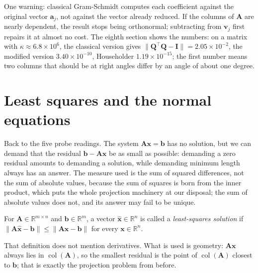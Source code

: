 One warning: classical Gram-Schmidt computes each coefficient against the original vector
$\mathbf{a}_{j}$, not against the vector already reduced. If the columns of $\mathbf{A}$ are
nearly dependent, the result stops being orthonormal; subtracting from $\mathbf{v}_{j}$ first
repairs it at almost no cost. The eighth section shows the numbers: on a
matrix with $\kappa\approx6.8\times10^{6}$, the classical version gives
$\|\mathbf{Q}^{\top}\mathbf{Q}-\mathbf{I}\|=2.05\times10^{-2}$, the modified version
$3.40\times10^{-10}$, Householder $1.19\times10^{-15}$; the first number means two
columns that should be at right angles differ by an angle of about one degree.

\section{Least squares and the normal equations}

Back to the five probe readings. The system $\mathbf{A}\mathbf{x}=\mathbf{b}$ has no solution,
but we can demand that the residual $\mathbf{b}-\mathbf{A}\mathbf{x}$ be as small as possible:
demanding a zero residual amounts to demanding a solution, while demanding minimum length always
has an answer. The measure used is the sum of squared differences, not the sum of absolute values,
because the sum of squares is born from the inner product, which puts the whole projection
machinery at our disposal; the sum of absolute values does not, and its answer may fail to be unique.


\begin{definisi}
For $\mathbf{A}\in\mathbb{R}^{m\times n}$ and $\mathbf{b}\in\mathbb{R}^{m}$,
a vector $\hat{\mathbf{x}}\in\mathbb{R}^{n}$ is called a \emph{least-squares solution}
if $\|\mathbf{A}\hat{\mathbf{x}}-\mathbf{b}\|\le\|\mathbf{A}\mathbf{x}-\mathbf{b}\|$
for every $\mathbf{x}\in\mathbb{R}^{n}$.
\end{definisi}

That definition does not mention derivatives. What is used is geometry: $\mathbf{A}\mathbf{x}$ always
lies in $\operatorname{col}(\mathbf{A})$, so the smallest residual is the point of
$\operatorname{col}(\mathbf{A})$ closest to $\mathbf{b}$; that is exactly the projection
problem from before.

